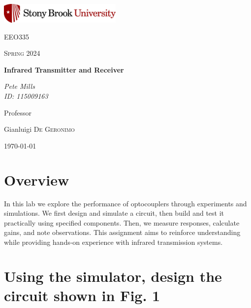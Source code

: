 \documentclass{article}
\begin{document}
	
\begin{titlepage}
	\centering
	\includegraphics[width=0.45\textwidth]{sbu}\par\vspace{1cm}
	{\LARGE \textsc{EEO335}\par}
	\vspace{1cm}
	{\Large \textsc{Spring 2024}\par}
	\vspace{1.5cm}
	{\huge\bfseries Infrared Transmitter and Receiver\par}
	\vspace{2cm}
	{\Large\itshape Pete Mills\\ID: 115009163\par}
	\vfill
	Professor\par
	Gianluigi \textsc{De Geronimo}

	\vfill

	{\large \today\par}
\end{titlepage}

	\newcommand{\assName}{Assignment 6-1.pdf}

	
	
	

	\section*{Overview}
	
	 In this lab we explore the performance of optocouplers through experiments and simulations. We first design and simulate a circuit, then build and test it practically using specified components. Then, we measure responses, calculate gains, and note observations. This assignment aims to reinforce understanding while providing hands-on experience with infrared transmission systems.

	
	\section{Using the simulator, design the circuit shown in Fig. 1}
\end{document}
